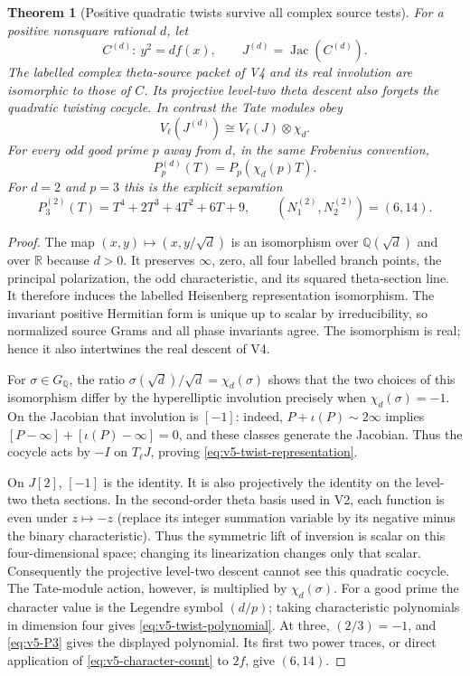 \documentclass[11pt]{article}
\newtheorem{theorem}{Theorem}[section]
\theoremstyle{definition}
\theoremstyle{remark}
\newcommand{\R}{\mathbb R}
\newcommand{\Q}{\mathbb Q}
\begin{document}
\begin{theorem}[Positive quadratic twists survive all complex source tests]
\label{thm:v5-twist}
For a positive nonsquare rational $d$, let
\[
 C^{(d)}:\ y^2=d f(x),\qquad J^{(d)}=\operatorname{Jac}(C^{(d)}).
\]
The labelled complex theta-source packet of V4 and its real involution are
isomorphic to those of $C$. Its projective level-two theta descent also
forgets the quadratic twisting cocycle. In contrast the Tate modules obey
\begin{equation}
 \boxed{V_\ell(J^{(d)})\cong V_\ell(J)\otimes\chi_d.}
 \label{eq:v5-twist-representation}
\end{equation}
For every odd good prime $p$ away from $d$, in the same Frobenius convention,
\begin{equation}
 \boxed{P_p^{(d)}(T)=P_p(\chi_d(p)T).}
 \label{eq:v5-twist-polynomial}
\end{equation}
For $d=2$ and $p=3$ this is the explicit separation
\begin{equation}
 \boxed{
 P_3^{(2)}(T)=T^4+2T^3+4T^2+6T+9,\qquad
 (N_1^{(2)},N_2^{(2)})=(6,14).}
 \label{eq:v5-twist-example}
\end{equation}
\end{theorem}
\begin{proof}
The map $(x,y)\mapsto(x,y/\sqrt d)$ is an isomorphism over
$\Q(\sqrt d)$ and over $\R$ because $d>0$. It preserves $\infty$, zero,
all four labelled branch points, the principal polarization, the odd
characteristic, and its squared theta-section line. It therefore induces
the labelled Heisenberg representation isomorphism. The invariant positive
Hermitian form is unique up to scalar by irreducibility, so normalized
source Grams and all phase invariants agree. The isomorphism is real;
hence it also intertwines the real descent of V4.

For $\sigma\in G_\Q$, the ratio
$\sigma(\sqrt d)/\sqrt d=\chi_d(\sigma)$ shows that the two choices of
this isomorphism differ by the hyperelliptic involution precisely when
$\chi_d(\sigma)=-1$. On the Jacobian that involution is $[-1]$:
indeed, $P+\iota(P)\sim2\infty$ implies
$[P-\infty]+[\iota(P)-\infty]=0$, and these classes generate the
Jacobian. Thus the cocycle acts by $-I$ on $T_\ell J$, proving
\eqref{eq:v5-twist-representation}.

On $J[2]$, $[-1]$ is the identity. It is also projectively the identity
on the level-two theta sections. In the second-order theta basis used
in V2, each function is even under $z\mapsto-z$ (replace its integer
summation variable by its negative minus the binary characteristic).
Thus the symmetric lift of inversion is scalar on this four-dimensional
space; changing its linearization changes only that scalar. Consequently
the projective level-two descent cannot see this quadratic cocycle.
The Tate-module action, however, is multiplied by $\chi_d(\sigma)$.
For a good prime the character value is the Legendre symbol $(d/p)$;
taking characteristic polynomials in dimension four gives
\eqref{eq:v5-twist-polynomial}. At three, $(2/3)=-1$, and
\eqref{eq:v5-P3} gives the displayed polynomial. Its first two power
traces, or direct application of \eqref{eq:v5-character-count} to $2f$,
give $(6,14)$.
\end{proof}
\end{document}
